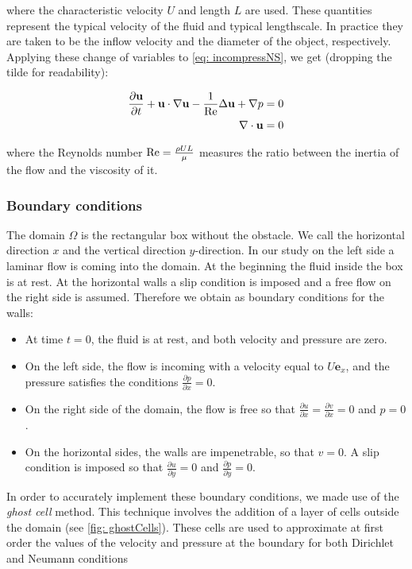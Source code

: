 where the characteristic velocity $U$ and length $L$ are used. These quantities represent the typical velocity of the fluid and typical lengthscale. In practice they are taken to be the inflow velocity and the diameter of the object, respectively. Applying these change of variables to \cref{eq: incompressNS}, we get (dropping the tilde for readability):

\begin{align}
  \frac{\partial \textbf{u}}{\partial t} + \textbf{u} \cdot \nabla \textbf{u} - \frac{1}{\text{Re}} \Delta \textbf{u} + \nabla p = 0 \\
  \nabla\cdot\boldsymbol{\mathrm{u}} = 0 \notag
\end{align}

where the Reynolds number $\mathrm{Re} = \frac{\rho U L}{\mu}$ measures the ratio between the inertia of the flow and the viscosity of it.

\subsubsection*{Boundary conditions}
The domain $\Omega$ is the rectangular box without the obstacle. We call the horizontal direction $x$ and the vertical direction $y$-direction. In our study on the left side a laminar flow is coming into the domain. At the beginning the fluid inside the box is at rest. At the horizontal walls a slip condition is imposed and a free flow on the right side is assumed. Therefore we obtain as boundary conditions for the walls:

\begin{itemize}
  \item At time $t=0$, the fluid is at rest, and both velocity and pressure are zero.
  \item On the left side, the flow is incoming with a velocity equal to $U \mathbf{e}_x$, and the pressure satisfies the conditions $\frac{\partial p}{\partial x} = 0$.
  \item On the right side of the domain, the flow is free so that $\frac{\partial u}{\partial x} = \frac{\partial v}{\partial x} = 0$ and $p = 0$.
  \item On the horizontal sides, the walls are impenetrable, so that $v = 0$. A slip condition is imposed so that $\frac{\partial u}{\partial y} = 0$ and $\frac{\partial p}{\partial y} = 0$.
\end{itemize}

In order to accurately implement these boundary conditions, we made use of the \textit{ghost cell} method. This technique involves the addition of a layer of cells outside the domain (see \cref{fig: ghostCells}). These cells are used to approximate at first order the values of the velocity and pressure at the boundary for both Dirichlet and Neumann conditions

